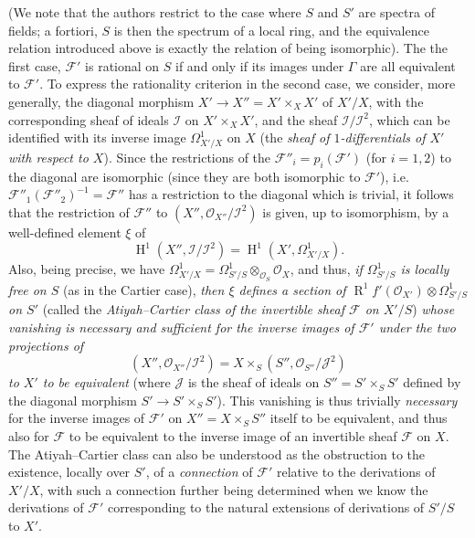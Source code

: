   (We note that the authors restrict to the case where \(S\) and \(S'\) are spectra of fields;
  a fortiori, \(S\) is then the spectrum of a local ring, and the equivalence relation introduced above is exactly the relation of being isomorphic).
  The the first case, \(\mathcal {F}'\) is rational on \(S\) if and only if its images under \(\Gamma \) are all equivalent to \(\mathcal {F}'\).
  To express the rationality criterion in the second case, we consider, more generally, the diagonal morphism \(X'\to  X''=X'\times _X X'\) of \(X'/X\), with the corresponding sheaf of ideals \(\mathscr {I}\) on \(X'\times _X X'\), and the sheaf \(\mathscr {I}/\mathscr {I}^2\), which can be identified with its inverse image \(\Omega _{X'/X}^1\) on \(X\) (the \emph{sheaf of \(1\)-differentials of \(X'\) with respect to \(X\)}).
  Since the restrictions of the \(\mathcal {F}''_i=p_i(\mathcal {F}')\) (for \(i=1,2\)) to the diagonal are isomorphic (since they are both isomorphic to \(\mathcal {F}'\)), i.e. \(\mathcal {F}''_1(\mathcal {F}''_2)^{-1}=\mathcal {F}''\) has a restriction to the diagonal which is trivial, it follows that the restriction of \(\mathcal {F}''\) to \((X'',\mathscr {O}_{X''}/\mathscr {I}^2)\) is given, up to isomorphism, by a well-defined element \(\xi \) of
  \[     \operatorname {H}^1(X'',\mathscr {I}/\mathscr {I}^2)     = \operatorname {H}^1(X',\Omega _{X'/X}^1).   \]
  Also, being precise, we have \(\Omega _{X'/X}^1=\Omega _{S'/S}^1\otimes _{\mathscr {O}_S}\mathscr {O}_X\), and thus, \emph{if \(\Omega _{S'/S}^1\) is locally free on \(S\)} (as in the Cartier case), \emph{then \(\xi \) defines a section of \(\operatorname {R}^1f'(\mathscr {O}_{X'})\otimes \Omega _{S'/S}^1\) on \(S'\)} (called the \emph{Atiyah–Cartier class of the invertible sheaf \(\mathcal {F}\) on \(X'/S\)}) \emph{whose vanishing is necessary and sufficient for the inverse images of \(\mathcal {F}'\) under the two projections of}
  \[     (X'',\mathscr {O}_{X''}/\mathscr {I}^2)     = X\times _S(S'',\mathscr {O}_{S''}/\mathscr {J}^2)   \]
  \emph{to \(X'\) to be equivalent} (where \(\mathscr {J}\) is the sheaf of ideals on \(S''=S'\times _S S'\) defined by the diagonal morphism \(S'\to  S'\times _S S'\)).
  This vanishing is thus trivially \emph{necessary} for the inverse images of \(\mathcal {F}'\) on \(X''=X\times _S S''\) itself to be equivalent, and thus also for \(\mathcal {F}\) to be equivalent to the inverse image of an invertible sheaf \(\mathcal {F}\) on \(X\).
  The Atiyah–Cartier class can also be understood as the obstruction to the existence, locally over \(S'\), of a \emph{connection} of \(\mathcal {F}'\) relative to the derivations of \(X'/X\), with such a connection further being determined when we know the derivations of \(\mathcal {F}'\) corresponding to the natural extensions of derivations of \(S'/S\) to \(X'\).
